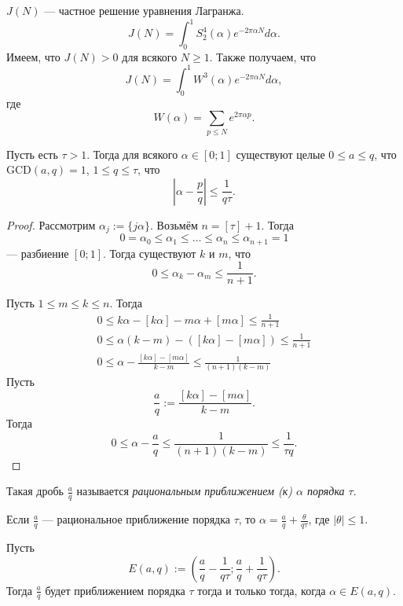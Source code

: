 \documentclass[12pt,a4paper]{article}
\newcommand{\GCD}{\mathrm{GCD}}
\begin{document}
    $J(N)$ --- частное решение уравнения Лагранжа.
    \[J(N) = \int_0^1 S_2^4(\alpha) e^{-2\pi \alpha N} d\alpha.\]
    Имеем, что $J(N) > 0$ для всякого $N \geqslant 1$. Также получаем, что
    \[J(N) = \int_0^1 W^3(\alpha) e^{-2\pi \alpha N} d\alpha,\]
    где
    \[W(\alpha) = \sum_{p \leqslant N} e^{2\pi \alpha p}.\]

    \begin{theorem}
        Пусть есть $\tau > 1$. Тогда для всякого $\alpha \in [0; 1]$ существуют целые $0 \leqslant a \leqslant q$, что $\GCD(a, q) = 1$, $1 \leqslant q \leqslant \tau$, что
        \[|\alpha - \frac{p}{q}| \leqslant \frac{1}{q \tau}.\]
    \end{theorem}

    \begin{proof}
        Рассмотрим $\alpha_j := \{j\alpha\}$. Возьмём $n = [\tau] + 1$. Тогда
        \[0 = \alpha_0 \leqslant \alpha_1 \leqslant \dots \leqslant \alpha_n \leqslant \alpha_{n+1} = 1\]
        --- разбиение $[0; 1]$. Тогда существуют $k$ и $m$, что
        \[0 \leqslant \alpha_k - \alpha_m \leqslant \frac{1}{n+1}.\]

        Пусть $1 \leqslant m \leqslant k \leqslant n$. Тогда
        \begin{gather*}
            0 \leqslant k \alpha - [k \alpha] - m \alpha + [m \alpha] \leqslant \frac{1}{n+1}\\
            0 \leqslant \alpha(k-m) - ([k \alpha] - [m \alpha]) \leqslant \frac{1}{n+1}\\
            0 \leqslant \alpha - \frac{[k \alpha] - [m \alpha]}{k-m} \leqslant \frac{1}{(n+1)(k-m)}
        \end{gather*}
        Пусть
        \[\frac{a}{q} := \frac{[k \alpha] - [m \alpha]}{k-m}.\]
        Тогда
        \[0 \leqslant \alpha - \frac{a}{q} \leqslant \frac{1}{(n+1)(k-m)} \leqslant \frac{1}{\tau q}.\]
    \end{proof}

    \begin{remark}
        Такая дробь $\frac{a}{q}$ называется \emph{рациональным приближением (к) $\alpha$ порядка $\tau$}.
    \end{remark}

    \begin{remark}
        Если $\frac{a}{q}$ --- рациональное приближение порядка $\tau$, то $\alpha = \frac{a}{q} + \frac{\theta}{q \tau}$, где $|\theta| \leqslant 1$.
    \end{remark}

    \begin{remark}
        Пусть
        \[E(a, q) := (\frac{a}{q} - \frac{1}{q \tau}; \frac{a}{q} + \frac{1}{q \tau}).\]
        Тогда $\frac{a}{q}$ будет приближением порядка $\tau$ тогда и только тогда, когда $\alpha \in E(a, q)$.
    \end{remark}
\end{document}
